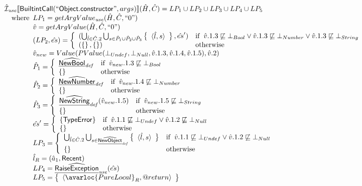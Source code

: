 \[\begin{array}{l}
\aI_{\it use}\lbr \SF{BuiltintCall}(``\SF{Object.constructor}",args)\rbr(\hat{H},\hat{C}) = LP_1 \cup LP_2\cup LP_3 \cup LP_4 \cup LP_5\\
\quad\wherec{
  LP_1 = getArgValue_{\it use}(\hat{H}, \hat{C}, ``0")\\
  \hat{v} = getArgValue(\hat{H}, \hat{C}, ``0")\\
  (LP_2, \hat{es}) = \left\{\begin{array}{ll}
      (\bigcup_{\hat{l} \in \hat{C}.2} \bigcup_{s \in \hat{P}_1\cup \hat{P}_2 \cup \hat{P}_3} \set{\langle \hat{l}, s \rangle}, \hat{es}')
      & \ifc{\hat{v}.1.3 \not\sqsubseteq \bot_{Bool} \lor \hat{v}.1.3 \not\sqsubseteq \bot_{Number} \lor \hat{v}.1.3 \not\sqsubseteq \bot_{String}}\\
      (\set{}, \set{}) & \owc
    \end{array}\right.\\
  \hat{v}_{new} = Value(PValue(\bot_{Undef}, \bot_{Null}, \hat{v}.1.3, \hat{v}.1.4, \hat{v}.1.5), \hat{v}.2)\\
  \hat{P}_1 = \left\{\begin{array}{ll}
      \ahf{NewBool}_{\it def}
      & \ifc{\hat{v}_{new}.1.3 \not\sqsubseteq \bot_{Bool}}\\
      \set{} & \owc
    \end{array}\right.\\
  \hat{P}_2 = \left\{\begin{array}{ll}
      \ahf{NewNumber}_{\it def}
      & \ifc{\hat{v}_{new}.1.4 \not\sqsubseteq \bot_{Number}}\\
      \set{} & \owc
    \end{array}\right.\\
  \hat{P}_3 = \left\{\begin{array}{ll}
      \ahf{NewString}_{\it def}(\hat{v}_{new}.1.5)
      & \ifc{\hat{v}_{new}.1.5 \not\sqsubseteq \bot_{String}}\\
      \set{} & \owc
    \end{array}\right.\\
  \hat{es}' = \left\{\begin{array}{ll}
      \{ \SF{TypeError} \}
      & \ifc{\hat{v}.1.1 \not\sqsubseteq \bot_{Undef} \lor \hat{v}.1.2 \not\sqsubseteq \bot_{Null}}\\
      \set{} & \owc
    \end{array}\right.\\
  LP_3 = \left\{\begin{array}{ll}
      \bigcup_{\hat{l} \in \hat{C}.2} \bigcup_{s \in \ahf{NewObject}_{\it def}} \set{\langle \hat{l}, s \rangle}
      & \ifc{\hat{v}.1.1 \not\sqsubseteq \bot_{Undef} \lor \hat{v}.1.2 \not\sqsubseteq \bot_{Null}}\\
      \set{} & \owc
    \end{array}\right.\\
  \hat{l}_R = (\hat{a}_1, \SF{Recent})\\
  LP_4 = \ahf{RaiseException}_{\it use}(\hat{es})\\
  LP_5 = \set{\langle\avarloc{PureLocal}_R,\varprop{return}\rangle}\\
  }\\
\\


\end{array}\]
